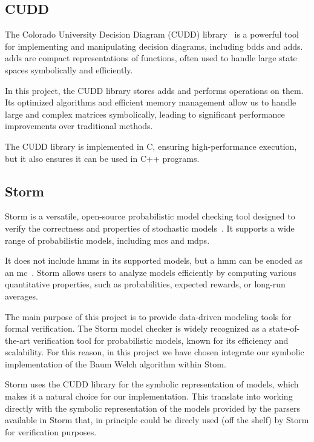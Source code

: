 \subsection{CUDD}\label{subsec:cudd}
The Colorado University Decision Diagram (CUDD) library~\cite{somenzi1997cudd} is a powerful tool for implementing and manipulating decision diagrams, including \glspl{bdd} and \glspl{add}. \glspl{add} are compact representations of functions, often used to handle large state spaces symbolically and efficiently.

In this project, the CUDD library stores \glspl{add} and performs operations on them.
Its optimized algorithms and efficient memory management allow us to handle large and complex matrices symbolically, leading to significant performance improvements over traditional methods.

The CUDD library is implemented in C, ensuring high-performance execution, but it also ensures it can be used in C++ programs.

\subsection{Storm}\label{subsec:storm}

Storm is a versatile, open-source probabilistic model checking tool designed to verify the correctness and properties of stochastic models~\cite{hensel2021probabilistic}. 
It supports a wide range of probabilistic models, including \glspl{mc} and \glspl{mdp}.

It does not include \glspl{hmm} in its supported models, but a \gls{hmm} can be enoded as an \gls{mc}~\cite{rabiner1989tutorial}.
Storm allows users to analyze models efficiently by computing various quantitative properties, such as probabilities, expected rewards, or long-run averages.

The main purpose of this project is to provide data-driven modeling tools for formal verification.
The Storm model checker is widely recognized as a state-of-the-art verification tool for probabilistic models, known for its efficiency and scalability.
For this reason, in this project we have chosen integrate our symbolic implementation of the Baum Welch algorithm within Stom. 

Storm uses the CUDD library for the symbolic representation of models, which makes it a natural choice for our implementation.
This translate into working directly with the symbolic representation of the models provided by the parsers available in Storm that, in principle could be direcly used (off the shelf) by Storm for verification purposes.

